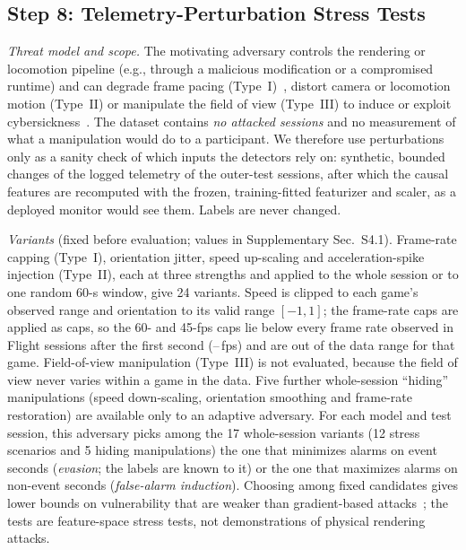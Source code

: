 \subsection{Step 8: Telemetry-Perturbation Stress Tests}
\label{sec:threat}
\emph{Threat model and scope.} The motivating adversary controls the rendering or locomotion pipeline (e.g., through a malicious modification or a compromised runtime) and can degrade frame pacing (Type~I)~\cite{odeleye2021framerate}, distort camera or locomotion motion (Type~II) or manipulate the field of view (Type~III) to induce or exploit cybersickness~\cite{tseng2022dark,kundu2025securing}. The dataset contains \emph{no attacked sessions} and no measurement of what a manipulation would do to a participant. We therefore use perturbations only as a sanity check of which inputs the detectors rely on: synthetic, bounded changes of the logged telemetry of the outer-test sessions, after which the causal features are recomputed with the frozen, training-fitted featurizer and scaler, as a deployed monitor would see them. Labels are never changed.

\emph{Variants} (fixed before evaluation; values in Supplementary Sec.~S4.1). Frame-rate capping (Type~I), orientation jitter, speed up-scaling and acceleration-spike injection (Type~II), each at three strengths and applied to the whole session or to one random 60-s window, give 24 variants. Speed is clipped to each game's observed range and orientation to its valid range $[-1,1]$; the frame-rate caps are applied as caps, so the 60- and 45-fps caps lie below every frame rate observed in Flight sessions after the first second (\SSFpsFlightMin--\SSFpsFlightMax\,fps) and are out of the data range for that game. Field-of-view manipulation (Type~III) is not evaluated, because the field of view never varies within a game in the data. Five further whole-session ``hiding'' manipulations (speed down-scaling, orientation smoothing and frame-rate restoration) are available only to an adaptive adversary. For each model and test session, this adversary picks among the 17 whole-session variants (12 stress scenarios and 5 hiding manipulations) the one that minimizes alarms on event seconds (\emph{evasion}; the labels are known to it) or the one that maximizes alarms on non-event seconds (\emph{false-alarm induction}). Choosing among fixed candidates gives lower bounds on vulnerability that are weaker than gradient-based attacks~\cite{kundu2025securing,ahmed2025adversarialvr}; the tests are feature-space stress tests, not demonstrations of physical rendering attacks.

